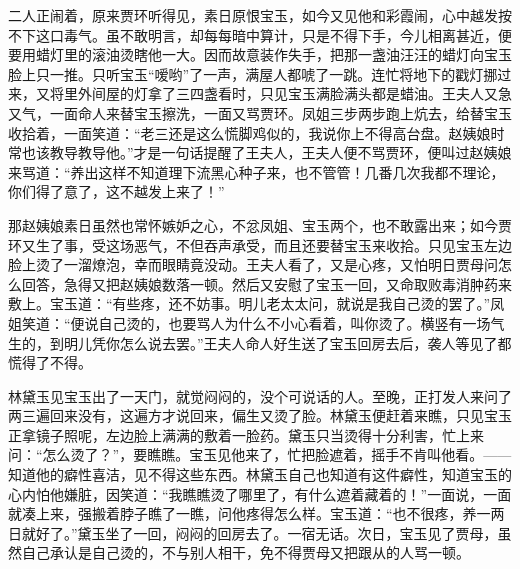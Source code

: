 \documentclass[12pt,oneside]{book}
\begin{document}
二人正闹着，原来贾环听得见，素日原恨宝玉，如今又见他和彩霞闹，心中越发按不下这口毒气。虽不敢明言，却每每暗中算计，只是不得下手，今儿相离甚近，便要用蜡灯里的滚油烫瞎他一大。因而故意装作失手，把那一盏油汪汪的蜡灯向宝玉脸上只一推。只听宝玉“嗳哟”了一声，满屋人都唬了一跳。连忙将地下的戳灯挪过来，又将里外间屋的灯拿了三四盏看时，只见宝玉满脸满头都是蜡油。王夫人又急又气，一面命人来替宝玉擦洗，一面又骂贾环。凤姐三步两步跑上炕去，给替宝玉收拾着，一面笑道：“老三还是这么慌脚鸡似的，我说你上不得高台盘。赵姨娘时常也该教导教导他。”才是一句话提醒了王夫人，王夫人便不骂贾环，便叫过赵姨娘来骂道：“养出这样不知道理下流黑心种子来，也不管管！几番几次我都不理论，你们得了意了，这不越发上来了！”

那赵姨娘素日虽然也常怀嫉妒之心，不忿凤姐、宝玉两个，也不敢露出来；如今贾环又生了事，受这场恶气，不但吞声承受，而且还要替宝玉来收拾。只见宝玉左边脸上烫了一溜燎泡，幸而眼睛竟没动。王夫人看了，又是心疼，又怕明日贾母问怎么回答，急得又把赵姨娘数落一顿。然后又安慰了宝玉一回，又命取败毒消肿药来敷上。宝玉道：“有些疼，还不妨事。明儿老太太问，就说是我自己烫的罢了。”凤姐笑道：“便说自己烫的，也要骂人为什么不小心看着，叫你烫了。横竖有一场气生的，到明儿凭你怎么说去罢。”王夫人命人好生送了宝玉回房去后，袭人等见了都慌得了不得。

林黛玉见宝玉出了一天门，就觉闷闷的，没个可说话的人。至晚，正打发人来问了两三遍回来没有，这遍方才说回来，偏生又烫了脸。林黛玉便赶着来瞧，只见宝玉正拿镜子照呢，左边脸上满满的敷着一脸药。黛玉只当烫得十分利害，忙上来问：“怎么烫了？”，要瞧瞧。宝玉见他来了，忙把脸遮着，摇手不肯叫他看。——知道他的癖性喜洁，见不得这些东西。林黛玉自己也知道有这件癖性，知道宝玉的心内怕他嫌脏，因笑道：“我瞧瞧烫了哪里了，有什么遮着藏着的！”一面说，一面就凑上来，强搬着脖子瞧了一瞧，问他疼得怎么样。宝玉道：“也不很疼，养一两日就好了。”黛玉坐了一回，闷闷的回房去了。一宿无话。次日，宝玉见了贾母，虽然自己承认是自己烫的，不与别人相干，免不得贾母又把跟从的人骂一顿。
\end{document}
